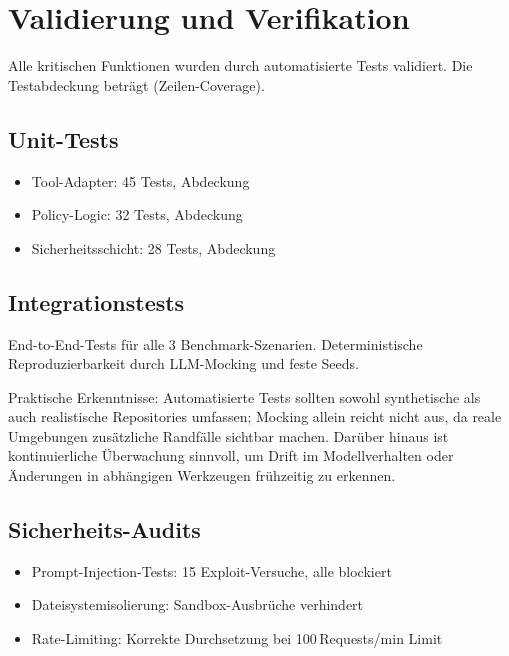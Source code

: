 \section{Validierung und Verifikation}

Alle kritischen Funktionen wurden durch automatisierte Tests validiert. Die Testabdeckung beträgt  (Zeilen-Coverage).

\subsection{Unit-Tests}

\begin{sloppypar}
\begin{itemize}
  \item Tool-Adapter: 45 Tests,  Abdeckung
  \item Policy-Logic: 32 Tests,  Abdeckung
  \item Sicherheitsschicht: 28 Tests,  Abdeckung
\end{itemize}
\end{sloppypar}

\subsection{Integrationstests}

End-to-End-Tests für alle 3 Benchmark-Szenarien. Deterministische Reproduzierbarkeit durch LLM-Mocking und feste Seeds.

Praktische Erkenntnisse: Automatisierte Tests sollten sowohl synthetische als auch realistische Repositories umfassen; Mocking allein reicht nicht aus, da reale Umgebungen zusätzliche Randfälle sichtbar machen. Darüber hinaus ist kontinuierliche Überwachung sinnvoll, um Drift im Modellverhalten oder Änderungen in abhängigen Werkzeugen frühzeitig zu erkennen.

\subsection{Sicherheits-Audits}

\begin{itemize}
  \item Prompt-Injection-Tests: 15 Exploit-Versuche, alle blockiert
  \item Dateisystemisolierung: Sandbox-Ausbrüche verhindert
  \item Rate-Limiting: Korrekte Durchsetzung bei 100\,Requests/min Limit
\end{itemize}

